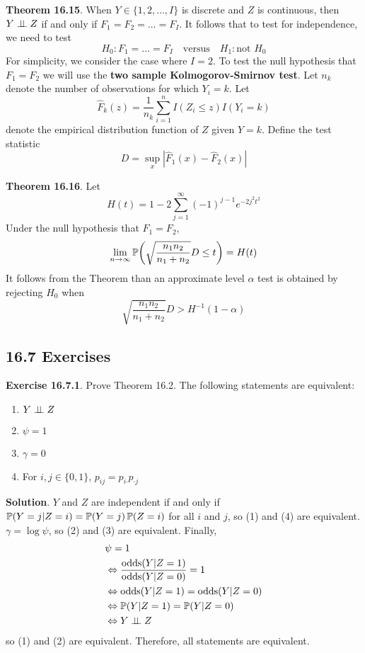 \textbf{Theorem 16.15}. When \(Y \in \{ 1, 2, \dots, I \}\) is discrete
and \(Z\) is continuous, then \(Y \perp\!\!\!\perp Z\) if and only if
\(F_{1} = F_{2} = \dots = F_I\).
It follows that to test for independence, we need to test
\[
H_{0}: F_{1} = \dots = F_I
\quad \text{versus} \quad
H_{1}: \text{not } H_{0}
\]
For simplicity, we consider the case where \(I = 2\). To test the null
hypothesis that \(F_{1} = F_{2}\) we will use the \textbf{two sample
Kolmogorov-Smirnov test}.
Let \(n_{k}\) denote the number of observations for which \(Y_{i} = k\). Let
\[
\hat{F}_{k}(z) = \frac{1}{n_{k}} \sum_{i=1}^{n} I(Z_{i} \leq z) I(Y_{i} = k)
\]
denote the empirical distribution function of \(Z\) given \(Y = k\).
Define the test statistic
\[
D = \sup_x | \hat{F}_{1}(x) - \hat{F}_{2}(x) |
\]

\textbf{Theorem 16.16}. Let
\[
H(t) = 1 - 2 \sum_{j=1}^{\infty} (-1)^{j-1} e^{-2j^{2}t^{2}}
\]
Under the null hypothesis that \(F_{1} = F_{2}\),
\[
\lim_{n \rightarrow \infty} \PROB \left( \sqrt{\frac{n_{1} n_{2}}{n_{1} + n_{2}}} D \leq t \right) = H(t)
\]
It follows from the Theorem than an approximate level \(\alpha\) test is
obtained by rejecting \(H_{0}\) when
\[
\sqrt{\frac{n_{1} n_{2}}{n_{1} + n_{2}}} D > H^{-1}(1 - \alpha)
\]

\subsection*{16.7 Exercises}

\textbf{Exercise 16.7.1}. Prove Theorem 16.2.
The following statements are equivalent:
\begin{enumerate}[tightlist,label={\arabic*.}]
\item
  \(Y \perp\!\!\!\perp Z\)
\item
  \(\psi = 1\)
\item
  \(\gamma = 0\)
\item
  For \(i, j \in \{ 0, 1 \}\), \(p_{ij} = p_{i\text{·}} p_{\text{·}j}\)
\end{enumerate}

\textbf{Solution}.
\(Y\) and \(Z\) are independent if and only if
\(\operatorname{\mathbb{P}}(Y = j | Z = i) = \operatorname{\mathbb{P}}(Y = j) \operatorname{\mathbb{P}}(Z = i)\) for
all \(i\) and \(j\), so (1) and (4) are equivalent.
\(\gamma = \log \psi\), so (2) and (3) are equivalent.
Finally,
\begin{align*}
&\psi = 1\\
&\Leftrightarrow \frac{\text{odds}(Y | Z = 1)}{\text{odds}(Y | Z = 0)} = 1 \\
&\Leftrightarrow \text{odds}(Y | Z = 1) = \text{odds}(Y | Z = 0) \\
&\Leftrightarrow \operatorname{\mathbb{P}}(Y | Z = 1) = \operatorname{\mathbb{P}}(Y | Z = 0) \\
&\Leftrightarrow Y \perp\!\!\!\perp Z
\end{align*}
so (1) and (2) are equivalent.
Therefore, all statements are equivalent.

